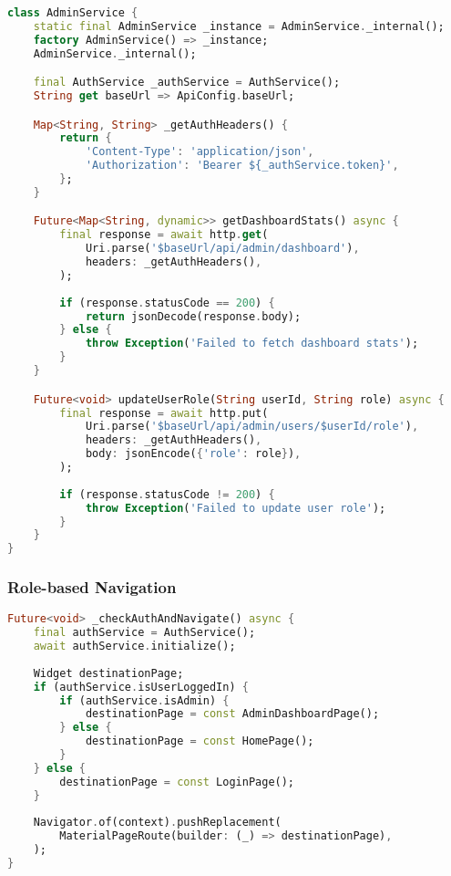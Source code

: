 \documentclass[12pt,a4paper]{article}
\begin{document}
\begin{lstlisting}[language=Dart, caption=Admin Service Implementation]
class AdminService {
    static final AdminService _instance = AdminService._internal();
    factory AdminService() => _instance;
    AdminService._internal();

    final AuthService _authService = AuthService();
    String get baseUrl => ApiConfig.baseUrl;

    Map<String, String> _getAuthHeaders() {
        return {
            'Content-Type': 'application/json',
            'Authorization': 'Bearer ${_authService.token}',
        };
    }

    Future<Map<String, dynamic>> getDashboardStats() async {
        final response = await http.get(
            Uri.parse('$baseUrl/api/admin/dashboard'),
            headers: _getAuthHeaders(),
        );
        
        if (response.statusCode == 200) {
            return jsonDecode(response.body);
        } else {
            throw Exception('Failed to fetch dashboard stats');
        }
    }

    Future<void> updateUserRole(String userId, String role) async {
        final response = await http.put(
            Uri.parse('$baseUrl/api/admin/users/$userId/role'),
            headers: _getAuthHeaders(),
            body: jsonEncode({'role': role}),
        );
        
        if (response.statusCode != 200) {
            throw Exception('Failed to update user role');
        }
    }
}
\end{lstlisting}

\subsubsection{Role-based Navigation}

\begin{lstlisting}[language=Dart, caption=Splash Screen với Role Check]
Future<void> _checkAuthAndNavigate() async {
    final authService = AuthService();
    await authService.initialize();
    
    Widget destinationPage;
    if (authService.isUserLoggedIn) {
        if (authService.isAdmin) {
            destinationPage = const AdminDashboardPage();
        } else {
            destinationPage = const HomePage();
        }
    } else {
        destinationPage = const LoginPage();
    }
    
    Navigator.of(context).pushReplacement(
        MaterialPageRoute(builder: (_) => destinationPage),
    );
}
\end{lstlisting}
\end{document}
